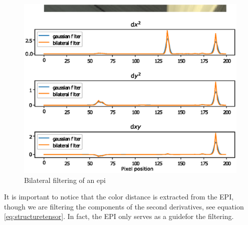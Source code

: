 \documentclass  [
  paper    = a4,
  BCOR     = 10mm,
  twoside,
  fontsize = 12pt,
  fleqn,
  toc      = bibnumbered,
  toc      = listofnumbered,
  numbers  = noendperiod,
  headings = normal,
  listof   = leveldown,
  version  = 3.03
]                                       {scrreprt}
\begin{document}
\begin{figure}
	\centering
	\includegraphics[width=0.7\linewidth]{images/bilat}
	\caption[Bilateral filtering]{Bilateral filtering of an epi}
	\label{fig:bilat}
\end{figure}

It is important to notice that the color distance is extracted from the EPI, though we are filtering the components of the second derivatives, see equation \ref{eq:structuretensor}. In fact, the EPI only serves as a \glqq guide\grqq for the filtering.
\end{document}
